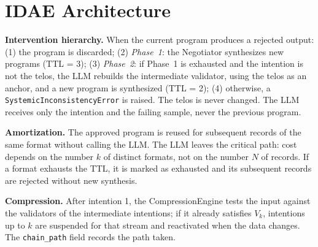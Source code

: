 \documentclass[sigconf,nonacm]{acmart}
\begin{document}
\section{IDAE Architecture}
\label{sec:arq}

\begin{table}[h]
\caption{IDAE components and their mutability}
\label{tab:components}
\end{table}

\textbf{Intervention hierarchy.} When the current program produces a rejected output: (1) the program is discarded; (2) \textit{Phase~1}: the Negotiator synthesizes new programs (TTL = 3); (3) \textit{Phase~2}: if Phase~1 is exhausted and the intention is not the telos, the LLM rebuilds the intermediate validator, using the telos as an anchor, and a new program is synthesized (TTL = 2); (4) otherwise, a \texttt{SystemicInconsistencyError} is raised. The telos is never changed. The LLM receives only the intention and the failing sample, never the previous program.

\textbf{Amortization.} The approved program is reused for subsequent records of the same format without calling the LLM. The LLM leaves the critical path: cost depends on the number $k$ of distinct formats, not on the number $N$ of records. If a format exhausts the TTL, it is marked as exhausted and its subsequent records are rejected without new synthesis.

\textbf{Compression.} After intention 1, the CompressionEngine tests the input against the validators of the intermediate intentions; if it already satisfies $V_k$, intentions up to $k$ are suspended for that stream and reactivated when the data changes. The \texttt{chain\_path} field records the path taken.
\end{document}
